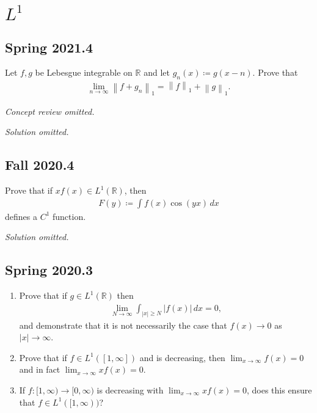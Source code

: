 \hypertarget{l1}{%
\section{\texorpdfstring{\(L^1\)}{L\^{}1}}\label{l1}}

\hypertarget{spring-2021.4}{%
\subsection{Spring 2021.4}\label{spring-2021.4}}

Let \(f, g\) be Lebesgue integrable on \({\mathbb{R}}\) and let
\(g_n(x) \coloneqq g(x- n)\). Prove that
\begin{align*}
\lim_{n\to \infty } {\left\lVert {f + g_n} \right\rVert}_1 = {\left\lVert {f} \right\rVert}_1 + {\left\lVert {g} \right\rVert}_1
.\end{align*}

\emph{Concept review omitted.}

\emph{Solution omitted.}

\hypertarget{fall-2020.4}{%
\subsection{Fall 2020.4}\label{fall-2020.4}}

\begin{problem}[?]

Prove that if \(xf(x) \in L^1({\mathbb{R}})\), then
\begin{align*}  
F(y) \coloneqq\int f(x) \cos(yx)\,  dx
\end{align*}
defines a \(C^1\) function.

\end{problem}

\emph{Solution omitted.}

\hypertarget{spring-2020.3}{%
\subsection{Spring 2020.3}\label{spring-2020.3}}

\begin{enumerate}
\def\labelenumi{\alph{enumi}.}
\item
  Prove that if \(g\in L^1({\mathbb{R}})\) then
  \begin{align*}
  \lim_{N\to \infty} \int _{{\left\lvert {x} \right\rvert} \geq N} {\left\lvert {f(x)} \right\rvert} \, dx = 0
  ,\end{align*}
  and demonstrate that it is not necessarily the case that
  \(f(x) \to 0\) as \({\left\lvert {x} \right\rvert}\to \infty\).
\item
  Prove that if \(f\in L^1([1, \infty])\) and is decreasing, then
  \(\lim_{x\to\infty}f(x) =0\) and in fact
  \(\lim_{x\to \infty} xf(x) = 0\).
\item
  If \(f: [1, \infty) \to [0, \infty)\) is decreasing with
  \(\lim_{x\to \infty} xf(x) = 0\), does this ensure that
  \(f\in L^1([1, \infty))\)?
\end{enumerate}

